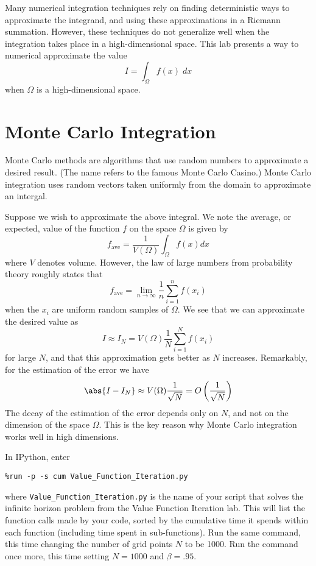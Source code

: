 
Many numerical integration techniques rely on finding deterministic ways to
approximate the integrand, and using these approximations in a Riemann
summation. However, these techniques do not generalize well when the integration
takes place in a high-dimensional space. This lab presents a way to numerical
approximate the value
\[I = \int_{\Omega} f(x) \;dx \]
when $\Omega$ is a high-dimensional space.

\section*{Monte Carlo Integration}
Monte Carlo methods are algorithms that use random numbers to approximate a
desired result. (The name refers to the famous Monte Carlo Casino.) Monte Carlo
integration uses random vectors taken uniformly from the domain to approximate
an intergal.

Suppose we wish to approximate the above integral. We note the average, or
expected, value of the function $f$ on the space $\Omega$ is given by
\[f_{\text{ave}} = \frac{1}{V(\Omega)}\int_{\Omega} f(x) dx \]
where $V$ denotes volume. However, the law of large numbers from probability
theory roughly states that
\[f_{\text{ave}} = \lim_{n \to \infty} \frac{1}{n} \sum_{i=1}^{n} f(x_i) \]
when the $x_i$ are uniform random samples of $\Omega$. We see that we can
approximate the desired value as
\[I \approx I_N = V(\Omega)\frac{1}{N}\sum_{i=1}^{N} f(x_i) \]
for large $N$, and that this approximation gets better as $N$ increases.
Remarkably, for the estimation of the error we have
\[\abs{I - I_N} \approx V(\Omega)\frac{1}{\sqrt{N}} =
O\left(\frac{1}{\sqrt{N}}\right) \] 
The decay of the estimation of the error depends only on $N$, and not on the
dimension of the space $\Omega$. This is the key reason why Monte Carlo
integration works well in high dimensions.





\begin{problem}
\label{prob:profile}
In IPython, enter
\begin{lstlisting}
%run -p -s cum Value_Function_Iteration.py
\end{lstlisting}
where \texttt{Value\_Function\_Iteration.py} is the name of your script that solves the infinite horizon problem from the Value Function Iteration lab.  This will list the function calls made by your code, sorted by the cumulative time it spends within each function (including time spent in sub-functions).
Run the same command, this time changing the number of grid points $N$ to be 1000.
Run the command once more, this time setting $N=1000$ and $\beta = .95$.
\end{problem}

